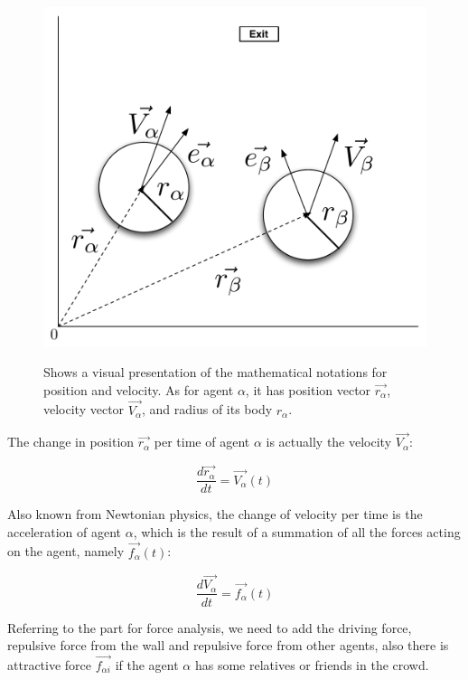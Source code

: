 \begin{figure}[hb]
    \centering
    {\includegraphics[scale=0.35]{Figures/NotationOfAgent.pdf}} 
    \caption{Shows a visual presentation of the mathematical notations for position and velocity. As for agent $ \alpha $, it has position vector $ \vec{r_{\alpha}} $, velocity vector $ \vec{V_{\alpha}} $, and radius of its body $ r_{\alpha} $.}
    \label{NotationOfAgent}
\end{figure}

The change in position $ \vec{r_{\alpha}} $ per time of 
agent $\alpha$ is actually the velocity $ \vec{V_{\alpha}} $:

\begin{equation}
		\frac{d \vec{r_{\alpha}}}{dt} = \vec{V_{\alpha}} \left( t \right)
\end{equation}

Also known from Newtonian physics, the change of velocity per time is the acceleration of agent $\alpha$, which is the result of a summation of all the forces acting on the agent, namely $\vec{f_{\alpha}} \left( t \right)$:

\begin{equation}
    \frac{d \vec{V_{\alpha}}}{dt} = \vec{f_{\alpha}} \left( t \right) 
\end{equation}

Referring to the part for force analysis, we need to add the driving force, repulsive force from the wall and repulsive force from other agents, also there is attractive force $ \vec{f_{\alpha i}} $ if the agent $ \alpha $ has some relatives or friends in the crowd.

